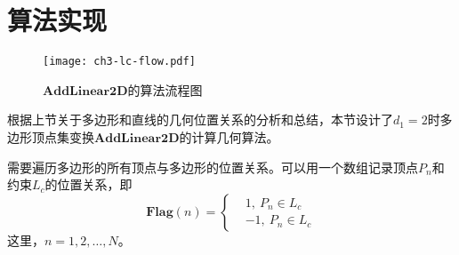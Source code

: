 \section{算法实现}\label{sect:3.3}
\begin{figure}[!h]
 \centering
 \texttt{[image: ch3-lc-flow.pdf]}\\	 %
 \caption{$\mathbf{AddLinear2D}$的算法流程图}
 \label{fig.3.ic.flow}
\end{figure}
根据上节关于多边形和直线的几何位置关系的分析和总结，本节设计了$d_{1}=2$时多边形顶点集变换$\mathbf{AddLinear2D}$的计算几何算法。

需要遍历多边形的所有顶点与多边形的位置关系。可以用一个数组记录顶点$P_{n}$和约束$L_{c}$的位置关系，即
\begin{equation}%
\mathbf{Flag}(n)=\left\{
\begin{aligned}%
&1,\ P_{n}\in L_{c}\\
&-1,\ P_{n}\in L_{c}
\end{aligned}
\end{equation}
这里，$n=1,2,\ldots,N$。

